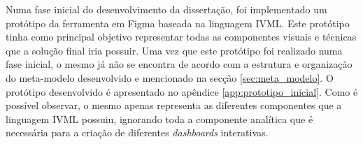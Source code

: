 Numa fase inicial do desenvolvimento da dissertação, foi implementado um protótipo da ferramenta em Figma \cite{figma} baseada na linguagem \gls{IVML}. Este protótipo tinha como principal objetivo representar todas as componentes visuais e técnicas que a solução final iria possuir. Uma vez que este protótipo foi realizado numa fase inicial, o mesmo já não se encontra de acordo com a estrutura e organização do meta-modelo desenvolvido e mencionado na secção \ref{sec:meta_modelo}. O protótipo desenvolvido é apresentado no apêndice \ref{app:prototipo_inicial}. Como é possível observar, o mesmo apenas representa as diferentes componentes que a linguagem \gls{IVML} possuiu, ignorando toda a componente analítica que é necessária para a criação de diferentes \textit{dashboards} interativas.

\begin{comment}

\section{Requisitos da ferramenta} %
\label{sec:requisitos}

Para tornar a ferramenta orientada às necessidades dos seus utilizadores, é necessário ter em consideração certas tecnologias para tornar esta experiência o mais orientada para o seu público-alvo. O objetivo principal da criação de uma ferramenta no contexto da dissertação, é auxiliar o processo de conceção e design de \textit{dashboards}, facilitando o processo iterativo de comunicação entre todos os seus utilizadores.

De forma a tornar esta ferramenta orientada para as funcionalidades que tem de realizar, existem algumas características que se tornam imperativas de serem implementadas. Estas característica são:

\begin{itemize}
  \item Implementação de uma abordagem drag-and-drop.
  \item Integração de \textit{screenshots} reais para dar suporte aos elementos visuais.
  \item Capacidade de desenvolver várias opções de layout do dashboard.
  \item Implementação de atalhos como \textit{copy-past} e duplicação.
  \item Suporte para diferentes perfis de utilizador.
  \item Capacidade de representar os elementos segundo o meta-modelo apresentado em \ref{app:meta_modelo_app}.
  \item Capacidade de oferecer uma visão detalhada sobre cada elemento utilizado (tipo de visualização, dados utilizados, objetivos de visualização).
  \item Capacidade de simular o comportamento do \textit{dashboard}.
  \item Capacidade de recolher \textit{feedback} dos utilizadores sobre o \textit{dashboard} criado.
\end{itemize}

\end{comment}